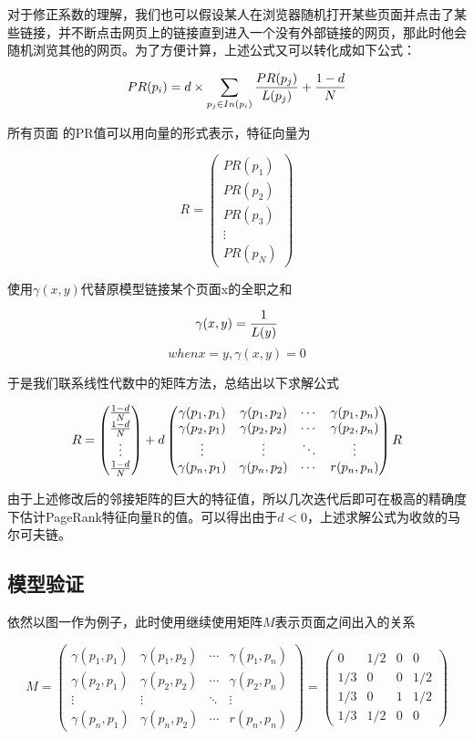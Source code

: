 \documentclass[UTF8
]{ctexart}
\begin{document}
对于修正系数的理解，我们也可以假设某人在浏览器随机打开某些页面并点击了某些链接，并不断点击网页上的链接直到进入一个没有外部链接的网页，那此时他会随机浏览其他的网页。为了方便计算，上述公式又可以转化成如下公式：

\[PR(p_i)=d\times \sum_{p_j \in In(p_i)}{PR(p_j)\over L(p_j)}+{1-d\over N}\]

所有页面 的PR值可以用向量的形式表示，特征向量为

\[R=\begin{pmatrix}
PR(p_1)\\PR(p_2)\\PR(p_3)\\\vdots\\PR(p_N)
\end{pmatrix}\]

使用\(\gamma(x,y)\)代替原模型链接某个页面x的全职之和

\[\gamma(x,y)={1\over L(y)}\]
\[when x=y,\gamma(x,y)=0\]

于是我们联系线性代数中的矩阵方法，总结出以下求解公式

\[R=\begin{pmatrix}{1-d\over N}\\{1-d\over N}\\\vdots\\{1-d\over N }\end{pmatrix}+d
\begin{pmatrix}\gamma(p_1,p_1)&\gamma(p_1,p_2)&\cdots&\gamma(p_1,p_n)
\\\gamma(p_2,p_1)&\gamma(p_2,p_2)&\cdots&\gamma(p_2,p_n)
\\\vdots&\vdots&\ddots&\vdots
\\\gamma(p_n,p_1)&\gamma(p_n,p_2)&\cdots&r(p_n,p_n)
\end{pmatrix}R\]

由于上述修改后的邻接矩阵的巨大的特征值，所以几次迭代后即可在极高的精确度下估计PageRank特征向量R的值。可以得出由于\(d<0\)，上述求解公式为收敛的马尔可夫链。

\hypertarget{header-n68}{%
\subsection{模型验证}\label{header-n68}}

依然以图一作为例子，此时使用继续使用矩阵\(M\)表示页面之间出入的关系

\[M=\begin{pmatrix}\gamma(p_1,p_1)&\gamma(p_1,p_2)&\cdots&\gamma(p_1,p_n)
\\\gamma(p_2,p_1)&\gamma(p_2,p_2)&\cdots&\gamma(p_2,p_n)
\\\vdots&\vdots&\ddots&\vdots
\\\gamma(p_n,p_1)&\gamma(p_n,p_2)&\cdots&r(p_n,p_n)
\end{pmatrix}=\begin{pmatrix}0&1/2&0&0\\
1/3&0&0&1/2\\
1/3&0&1&1/2\\
1/3&1/2&0&0
\end{pmatrix}\]
\end{document}
